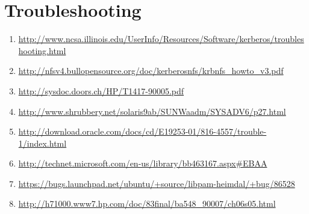 \documentclass[letterpaper,10pt,english]{sphinxmanual}
\begin{document}
\section{Troubleshooting}
\label{admin/various_envs:troubleshooting}\begin{enumerate}
\item {} 
\href{http://www.ncsa.illinois.edu/UserInfo/Resources/Software/kerberos/troubleshooting.html}{http://www.ncsa.illinois.edu/UserInfo/Resources/Software/kerberos/troubleshooting.html}

\item {} 
\href{http://nfsv4.bullopensource.org/doc/kerberosnfs/krbnfs\_howto\_v3.pdf}{http://nfsv4.bullopensource.org/doc/kerberosnfs/krbnfs\_howto\_v3.pdf}

\item {} 
\href{http://sysdoc.doors.ch/HP/T1417-90005.pdf}{http://sysdoc.doors.ch/HP/T1417-90005.pdf}

\item {} 
\href{http://www.shrubbery.net/solaris9ab/SUNWaadm/SYSADV6/p27.html}{http://www.shrubbery.net/solaris9ab/SUNWaadm/SYSADV6/p27.html}

\item {} 
\href{http://download.oracle.com/docs/cd/E19253-01/816-4557/trouble-1/index.html}{http://download.oracle.com/docs/cd/E19253-01/816-4557/trouble-1/index.html}

\item {} 
\href{http://technet.microsoft.com/en-us/library/bb463167.aspx\#EBAA}{http://technet.microsoft.com/en-us/library/bb463167.aspx\#EBAA}

\item {} 
\href{https://bugs.launchpad.net/ubuntu/+source/libpam-heimdal/+bug/86528}{https://bugs.launchpad.net/ubuntu/+source/libpam-heimdal/+bug/86528}

\item {} 
\href{http://h71000.www7.hp.com/doc/83final/ba548\_90007/ch06s05.html}{http://h71000.www7.hp.com/doc/83final/ba548\_90007/ch06s05.html}

\end{enumerate}



\renewcommand{\indexname}{Index}
\printindex
\end{document}
